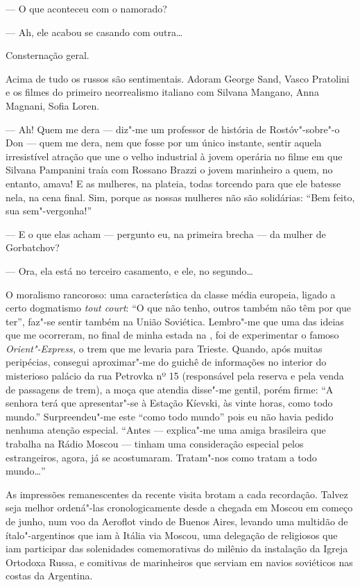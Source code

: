 --- O que aconteceu com o namorado?

--- Ah, ele acabou se casando com outra\ldots{}

Consternação geral.

Acima de tudo os russos são sentimentais. Adoram George Sand, Vasco
Pratolini e os filmes do primeiro neorrealismo italiano com Silvana
Mangano, Anna Magnani, Sofia Loren.

--- Ah! Quem me dera --- diz"-me um professor de história de Rostóv"-sobre"-o
Don --- quem me dera, nem que fosse por um único instante, sentir aquela
irresistível atração que une o velho industrial à jovem operária no
filme em que Silvana Pampanini traía com Rossano Brazzi o jovem
marinheiro a quem, no entanto, amava! E as mulheres, na plateia, todas
torcendo para que ele batesse nela, na cena final. Sim, porque as nossas
mulheres não são solidárias: ``Bem feito, sua sem"-vergonha!''

--- E o que elas acham --- pergunto eu, na primeira brecha --- da mulher de
Gorbatchov?

--- Ora, ela está no terceiro casamento, e ele, no segundo\ldots{}

O moralismo rancoroso: uma característica da classe média europeia,
ligado a certo dogmatismo \emph{tout court}: ``O que não tenho, outros
também não têm por que ter'', faz"-se sentir também na União Soviética.
Lembro"-me que uma das ideias que me ocorreram, no final de minha estada
na , foi de experimentar o famoso \emph{Orient"-Express,} o trem que
me levaria para Trieste. Quando, após muitas peripécias, consegui
aproximar"-me do guichê de informações no interior do misterioso palácio
da rua Petrovka nº 15 (responsável pela reserva e pela venda de
passagens de trem), a moça que atendia disse"-me gentil, porém firme: ``A
senhora terá que apresentar"-se à Estação Kíevski, às vinte horas, como
todo mundo.'' Surpreendeu"-me este ``como todo mundo'' pois eu não havia
pedido nenhuma atenção especial. ``Antes --- explica"-me uma amiga
brasileira que trabalha na Rádio Moscou --- tinham uma consideração
especial pelos estrangeiros, agora, já se acostumaram. Tratam"-nos como
tratam a todo mundo\ldots{}''

As impressões remanescentes da recente visita brotam a cada recordação.
Talvez seja melhor ordená"-las cronologicamente desde a chegada em Moscou
em começo de junho, num voo da Aeroflot vindo de Buenos Aires, levando
uma multidão de ítalo"-argentinos que iam à Itália via Moscou, uma
delegação de religiosos que iam participar das solenidades comemorativas
do milênio da instalação da Igreja Ortodoxa Russa, e comitivas de
marinheiros que serviam em navios soviéticos nas costas da Argentina.

